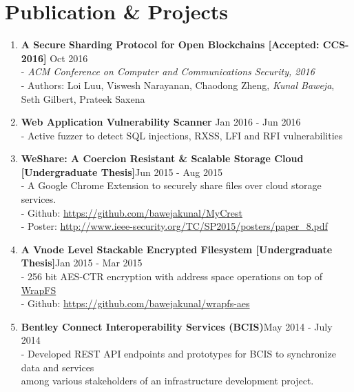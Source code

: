 \documentclass[a4]{article}
\begin{document}
\section*{Publication \& Projects}
\begin{enumerate}

    \item \textbf{A Secure Sharding Protocol for Open Blockchains [Accepted: CCS-2016]} {\hfill Oct 2016}\\
    - \textit{ACM Conference on Computer and Communications Security, 2016}\\
    - Authors: Loi Luu, Viswesh Narayanan, Chaodong Zheng, \textit{Kunal Baweja}, Seth Gilbert, Prateek Saxena

    \item \textbf{Web Application Vulnerability Scanner} {\hfill Jan 2016 - Jun 2016}\\
    - Active fuzzer to detect SQL injections, RXSS, LFI and RFI vulnerabilities 

    \item \textbf{WeShare: A Coercion Resistant \& Scalable Storage Cloud [Undergraduate Thesis]}{\hfill Jun 2015 - Aug 2015}\\
    - A Google Chrome Extension to securely share files over cloud storage services.\\
    - Github: \href{https://github.com/bawejakunal/MyCrest}{https://github.com/bawejakunal/MyCrest}\\
    - Poster: \href{http://www.ieee-security.org/TC/SP2015/posters/paper\_8.pdf}{http://www.ieee-security.org/TC/SP2015/posters/paper\_8.pdf}

    \item \textbf{A Vnode Level Stackable Encrypted Filesystem [Undergraduate Thesis]}{\hfill Jan 2015 - Mar 2015}\\
    - 256 bit AES-CTR encryption with address space operations on top of \href{http://wrapfs.filesystems.org/}{WrapFS}\\
    - Github: \href{https://github.com/bawejakunal/wrapfs-aes}{https://github.com/bawejakunal/wrapfs-aes}
    
    \item \textbf{Bentley Connect Interoperability Services (BCIS)}{\hfill May 2014 - July 2014}\\
    - Developed REST API endpoints and prototypes for BCIS to synchronize data and services\\
    \hspace*{0.7em}among various stakeholders of an infrastructure development project.
    

\end{enumerate}
\end{document}

